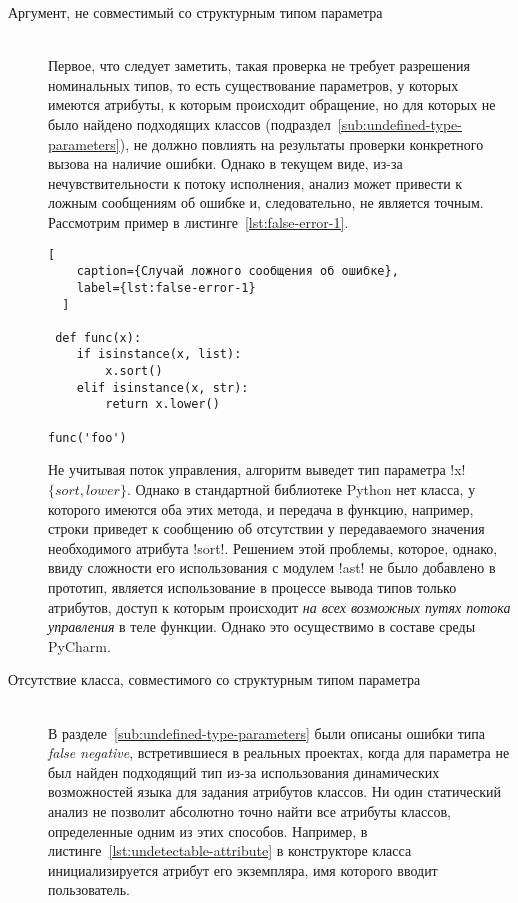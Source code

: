 \begin{description} 

\item[Аргумент, не совместимый со структурным типом параметра] \hfill \\ 
  Первое, что следует заметить, такая проверка не требует разрешения
  номинальных типов, то есть существование параметров, у которых имеются
  атрибуты, к которым происходит обращение, но для которых не было найдено
  подходящих классов (подраздел~\ref{sub:undefined-type-parameters}), не должно повлиять на результаты
  проверки конкретного вызова на наличие ошибки. Однако в текущем виде, из-за
  нечувствительности к потоку исполнения, анализ может привести к ложным
  сообщениям об ошибке и, следовательно, не является точным. Рассмотрим пример в
  листинге~\ref{lst:false-error-1}. 

  \begin{lstlisting}[
    caption={Случай ложного сообщения об ошибке},
    label={lst:false-error-1}
  ]

 def func(x):
    if isinstance(x, list):
        x.sort()
    elif isinstance(x, str):
        return x.lower()

func('foo')     
  \end{lstlisting}
    
  Не учитывая поток управления, алгоритм выведет тип параметра !x! $\{ sort,
  lower \}$. Однако в стандартной библиотеке Python нет класса, у которого
  имеются оба этих метода, и передача в функцию, например, строки приведет к сообщению об
  отсутствии у передаваемого значения необходимого атрибута !sort!. Решением
  этой проблемы, которое, однако, ввиду сложности его использования с модулем
  !ast! не было добавлено в прототип, является использование в процессе вывода
  типов только атрибутов, доступ к которым происходит \emph{на всех возможных путях
  потока управления} в теле функции. Однако это осуществимо в составе среды
  PyCharm.

\item[Отсутствие класса, совместимого со структурным типом параметра] \hfill \\
  В разделе~\ref{sub:undefined-type-parameters} были описаны ошибки типа
  \emph{false negative}, встретившиеся в реальных проектах, когда для параметра
  не был найден подходящий тип из-за использования динамических возможностей
  языка для задания атрибутов классов. Ни один
  статический анализ не позволит абсолютно точно найти все атрибуты классов,
  определенные одним из этих способов. Например, в
  листинге~\ref{lst:undetectable-attribute} в конструкторе класса инициализируется
  атрибут его экземпляра, имя которого вводит пользователь.


\end{description}
